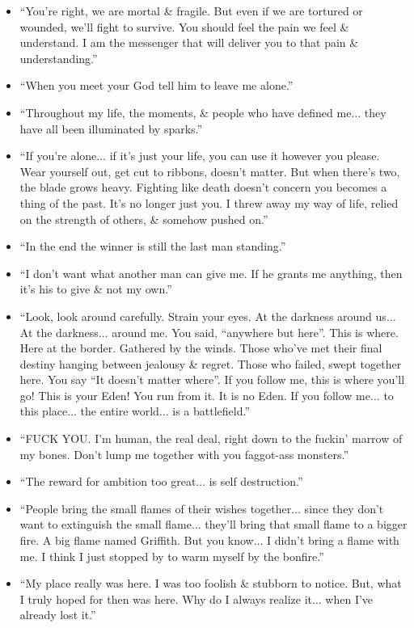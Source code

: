 \documentclass{article}
\begin{document}
\begin{enumerate}
\begin{itemize}
    	\item ``You're right, we are mortal \& fragile. But even if we are tortured or wounded, we'll fight to survive. You should feel the pain we feel \& understand. I am the messenger that will deliver you to that pain \& understanding.''
    	\item ``When you meet your God tell him to leave me alone.''
    	\item ``Throughout my life, the moments, \& people who have defined me$\ldots$ they have all been illuminated by sparks.''
    	\item ``If you're alone$\ldots$ if it's just your life, you can use it however you please. Wear yourself out, get cut to ribbons, doesn't matter. But when there's two, the blade grows heavy. Fighting like death doesn't concern you becomes a thing of the past. It's no longer just you. I threw away my way of life, relied on the strength of others, \& somehow pushed on.''
    	\item ``In the end the winner is still the last man standing.''
    	\item ``I don't want what another man can give me. If he grants me anything, then it's his to give \& not my own.''
    	\item ``Look, look around carefully. Strain your eyes. At the darkness around us$\ldots$ At the darkness$\ldots$ around me. You said, ``anywhere but here''. This is where. Here at the border. Gathered by the winds. Those who've met their final destiny hanging between jealousy \& regret. Those who failed, swept together here. You say ``It doesn't matter where''. If you follow me, this is where you'll go! This is your Eden! You run from it. It is no Eden. If you follow me$\ldots$ to this place$\ldots$ the entire world$\ldots$ is a battlefield.''
    	\item ``FUCK YOU. I'm human, the real deal, right down to the fuckin' marrow of my bones. Don't lump me together with you faggot-ass monsters.''
    	\item ``The reward for ambition too great$\ldots$ is self destruction.''
    	\item ``People bring the small flames of their wishes together$\ldots$  since they don't want to extinguish the small flame$\ldots$  they'll bring that small flame to a bigger fire. A big flame named Griffith. But you know$\ldots$  I didn't bring a flame with me. I think I just stopped by to warm myself by the bonfire.''
    	\item ``My place really was here. I was too foolish \& stubborn to notice. But, what I truly hoped for then was here. Why do I always realize it$\ldots$ when I've already lost it.''

\end{itemize}
\end{enumerate}
\end{document}
